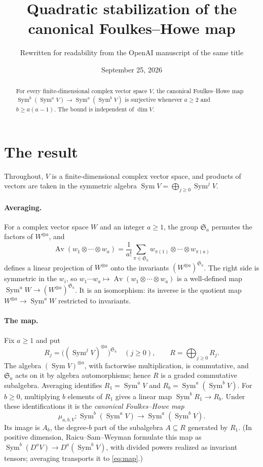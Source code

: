 \documentclass[11pt]{article}
\title{Quadratic stabilization of the canonical Foulkes--Howe map}
\author{Rewritten for readability from the OpenAI manuscript of the same title}
\date{September 25, 2026}
\theoremstyle{remark}
\DeclareMathOperator{\Sym}{Sym}
\DeclareMathOperator{\Av}{Av}
\newcommand{\Sa}{\mathfrak S_a}
\begin{document}
\maketitle
\begin{abstract}
For every finite-dimensional complex vector space $V$, the canonical
Foulkes--Howe map $\Sym^b(\Sym^a V)\to\Sym^a(\Sym^b V)$ is surjective
whenever $a\ge2$ and $b\ge a(a-1)$. The bound is independent of $\dim V$.
\end{abstract}

\section{The result}\label{sec:introduction}

Throughout, $V$ is a finite-dimensional complex vector space, and products
of vectors are taken in the symmetric algebra
$\Sym V=\bigoplus_{j\ge0}\Sym^jV$.

\paragraph{Averaging.}
For a complex vector space $W$ and an integer $a\ge1$, the group $\Sa$
permutes the factors of $W^{\otimes a}$, and
\begin{equation}\label{eq:average}
 \Av(w_1\otimes\cdots\otimes w_a)
 =\frac1{a!}\sum_{\pi\in\Sa}
 w_{\pi(1)}\otimes\cdots\otimes w_{\pi(a)}
\end{equation}
defines a linear projection of $W^{\otimes a}$ onto the invariants
$(W^{\otimes a})^{\Sa}$. The right side is symmetric in the $w_i$, so
$w_1\cdots w_a\mapsto\Av(w_1\otimes\cdots\otimes w_a)$ is a well-defined map
$\Sym^aW\to(W^{\otimes a})^{\Sa}$. It is an isomorphism: its inverse is the
quotient map $W^{\otimes a}\to\Sym^aW$ restricted to invariants.

\paragraph{The map.}
Fix $a\ge1$ and put
\[
 R_j=\bigl((\Sym^j V)^{\otimes a}\bigr)^{\Sa}\quad(j\ge0),\qquad
 R=\bigoplus_{j\ge0}R_j.
\]
The algebra $(\Sym V)^{\otimes a}$, with factorwise multiplication, is
commutative, and $\Sa$ acts on it by algebra automorphisms; hence $R$ is a
graded commutative subalgebra. Averaging identifies $R_1=\Sym^aV$ and
$R_b=\Sym^a(\Sym^bV)$. For $b\ge0$, multiplying $b$ elements of $R_1$ gives a
linear map $\Sym^bR_1\to R_b$. Under these identifications it is the
\emph{canonical Foulkes--Howe map}
\begin{equation}\label{eq:map}
 \mu_{a,b,V}:\Sym^b(\Sym^a V)\longrightarrow\Sym^a(\Sym^b V).
\end{equation}
Its image is $A_b$, the degree-$b$ part of the subalgebra $A\subseteq R$
generated by $R_1$. (In positive dimension, Raicu--Sam--Weyman
\cite[Section~2]{RSW} formulate this map as
$\Sym^b(D^aV)\to D^a(\Sym^bV)$, with divided powers realized as invariant
tensors; averaging transports it to \eqref{eq:map}.)
\end{document}
